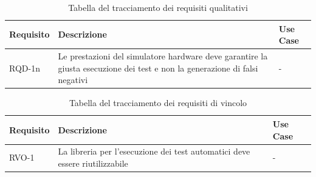 \begin{table}[h]
    \begin{tabularx}{\textwidth}{lXl}
        \hline
        \textbf{Requisito} & \textbf{Descrizione} & \textbf{Use Case}\\
        \hline
        RQD-1n & Le prestazioni del simulatore hardware deve garantire la giusta esecuzione dei test e non la generazione di falsi negativi & - \\
        \hline
    \end{tabularx}
    \vspace{4pt}
    \caption{Tabella del tracciamento dei requisiti qualitativi}
    \label{tab:requisiti_qualitativi}
\end{table}

\begin{table}[h]
    \begin{tabularx}{\textwidth}{lXl}
        \hline
        \textbf{Requisito} & \textbf{Descrizione} & \textbf{Use Case}\\
        \hline
        RVO-1 & La libreria per l'esecuzione dei test automatici deve essere riutilizzabile & - \\
        \hline
    \end{tabularx}
    \vspace{4pt}
    \caption{Tabella del tracciamento dei requisiti di vincolo}
    \label{tab:requisiti_vincolo}
\end{table}

\newpage